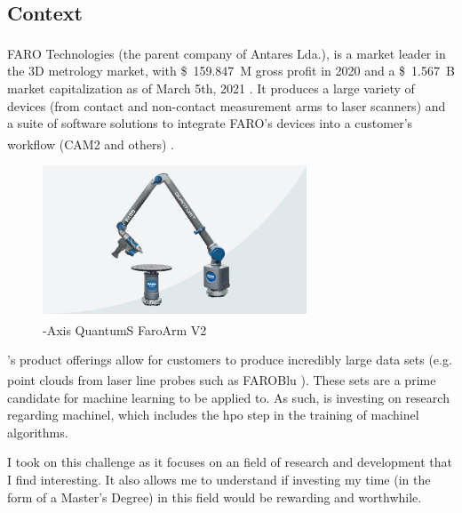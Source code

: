 
\subsection{Context}

FARO Technologies\textsuperscript{\textregistered} (the parent company of Antares Lda.), is a market leader in the 3D metrology market, with \SI{159.847}[\$]{M} gross profit in 2020 \parencite{faro_2021_financial_results} and a \SI{1.567}[\$]{B} market capitalization as of March 5th, 2021 \parencite{faro_stock_info}. It produces a large variety of devices (from contact and non-contact measurement arms to laser scanners) and a suite of software solutions to integrate FARO's devices into a customer's workflow (CAM2\textsuperscript{\textregistered} and others) \parencite{faro_homepage}.

\begin{figure}[ht]
\centering
\includegraphics[width=0.7\textwidth]{images/faro_quantum_s_arm.png}
\caption{-Axis QuantumS FaroArm\textsuperscript{\textregistered} V2}
\end{figure}
 
\faro's product offerings allow for customers to produce incredibly large data sets (e.g. point clouds from laser line probes such as FAROBlu\textsuperscript{\textregistered} \parencite{faro_quantums}). These sets are a prime candidate for machine learning to be applied to. As such, \faro is investing on research regarding \acrlong{machinel}, which includes the \acrfull{hpo} step in the training of \acrshort{machinel} algorithms.

I took on this challenge as it focuses on an field of research and development that I find interesting. It also allows me to understand if investing my time (in the form of a Master's Degree) in this field would be rewarding and worthwhile.